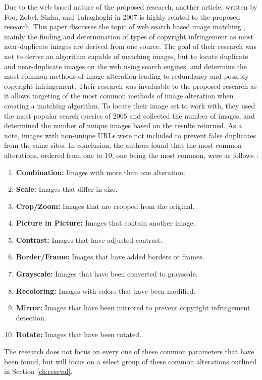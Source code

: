 Due to the web based nature of the proposed research, another article, written by Foo, Zobel, Sinha, and Tahaghoghi in 2007 is highly related to the proposed research. This paper discusses the topic of web search based image matching \cite{Foo:2007}, mainly the finding and determination of types of copyright infringement as most near-duplicate images are derived from one source. The goal of their research was not to derive an algorithm capable of matching images, but to locate duplicate and near-duplicate images on the web using search engines, and determine the most common methods of image alteration leading to redundancy and possibly copyright infringement. Their research was invaluable to the proposed research as it allows targeting of the most common methods of image alteration when creating a matching algorithm. To locate their image set to work with, they used the most popular search queries of 2005 and collected the number of images, and determined the number of unique images based on the results returned. As a note, images with non-unique URLs were not included to prevent false duplicates from the same sites. In conclusion, the authors found that the most common alterations, ordered from one to 10, one being the most common, were as follows \cite{Foo:2007}:
\begin{enumerate}
\item
\textbf{Combination:} Images with more than one alteration.
\item
\textbf{Scale:} Images that differ in size.
\item
\textbf{Crop/Zoom:} Images that are cropped from the original.
\item
\textbf{Picture in Picture:} Images that contain another image.
\item
\textbf{Contrast:} Images that have adjusted contrast.
\item
\textbf{Border/Frame:} Images that have added borders or frames.
\item
\textbf{Grayscale:} Images that have been converted to grayscale.
\item
\textbf{Recoloring:} Images with colors that have been modified.
\item
\textbf{Mirror:} Images that have been mirrored to prevent copyright infringement detection.
\item
\textbf{Rotate:} Images that have been rotated.
\end{enumerate}

The research does not focus on every one of these common parameters that have been found, but will focus on a select group of these common alterations outlined in Section \ref{ch:reseval}.

